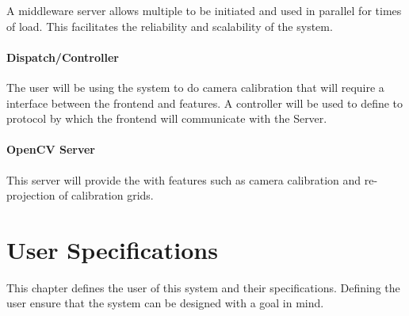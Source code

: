\documentclass[11pt]{report}
\begin{document}
A middleware server allows multiple  to be initiated and used in parallel for times of load. This facilitates the reliability and scalability of the system. 

\subsubsection{Dispatch/Controller}


The user will be using the system to do camera calibration that will require a interface between the frontend and  features. A controller will be used to define to protocol by which the frontend will communicate with the  Server. 

\subsubsection{OpenCV Server}

This server will provide the  with  features such as camera calibration and re-projection of calibration grids.

\chapter{User Specifications}

This chapter defines the user of this system and their specifications. Defining the user ensure that the system can be designed with a  goal in mind. 
\end{document}

